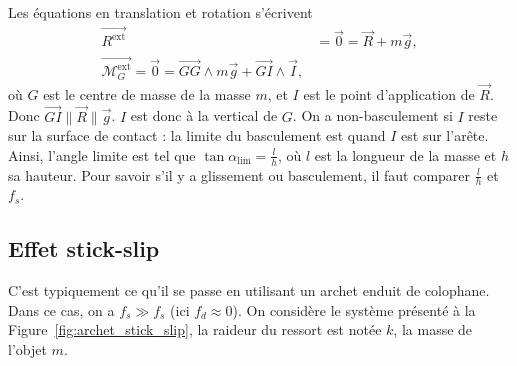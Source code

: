             Les équations en translation et rotation s'écrivent
            \begin{equation*}
                \begin{aligned}
                    \vec{R^{\text{ext}}}&=\vec{0}=\vec{R}+m\vec{g},\\
                    \vec{\mathcal{M}_{G}^{\text{ext}}}=\vec{0}=\vec{GG}\wedge m\vec{g}+\vec{GI}\wedge\vec{I},
                \end{aligned}
            \end{equation*}
            où $G$ est le centre de masse de la masse $m$, et $I$ est le point d'application de $\vec{R}$. Donc $\vec{GI}\parallel\vec{R}\parallel\vec{g}$. $I$ est donc à la vertical de $G$. On a non-basculement si $I$ reste sur la surface de contact : la limite du basculement est quand $I$ est sur l'arête. Ainsi, l'angle limite est tel que $\tan\alpha_{\text{lim}}=\frac{l}{h}$, où $l$ est la longueur de la masse et $h$ sa hauteur. Pour savoir s'il y a glissement ou basculement, il faut comparer $\frac{l}{h}$ et $f_s$.

    \subsection{Effet \og stick-slip\fg}

        C'est typiquement ce qu'il se passe en utilisant un archet enduit de colophane. Dans ce cas, on a $f_s\gg f_s$ (ici $f_d\approx0$). On considère le système présenté à la Figure~\ref{fig:archet_stick_slip}, la raideur du ressort est notée $k$, la masse de l'objet $m$.

